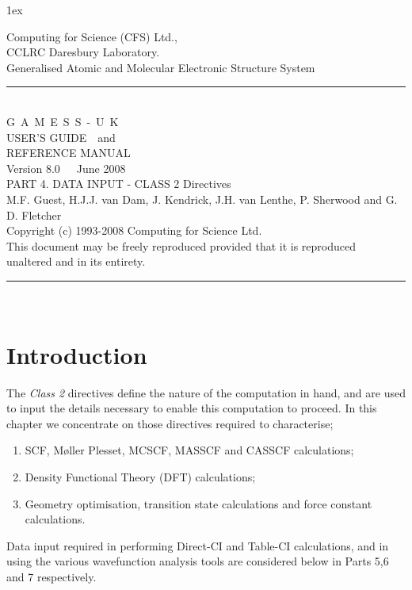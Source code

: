 \documentclass[11pt,fleqn]{article}
\begin{document}
\sf
\parindent 0cm
\parskip 1ex
\setcounter{secnumdepth}{4}
\begin{flushleft}
Computing for Science (CFS) Ltd.,\\CCLRC Daresbury Laboratory.\\[0.30in]
{\large Generalised Atomic and Molecular Electronic Structure System }\\[.2in]
\rule{150mm}{3mm}\\
\vspace{.2in}
{\huge G~A~M~E~S~S~-~U~K}\\[.3in]
{\huge USER'S GUIDE~~and}\\[.2in]
{\huge REFERENCE MANUAL}\\[0.2in]
{\huge Version 8.0~~~June 2008}\\ [.2in]
{\large PART 4. DATA INPUT - CLASS 2 Directives}\\
\vspace{.1in}
{\large M.F. Guest, H.J.J. van Dam, J. Kendrick, J.H. van Lenthe,
  P. Sherwood and G. D. Fletcher}\\[0.2in]

Copyright (c) 1993-2008 Computing for Science Ltd.\\[.1in]
This document may be freely reproduced provided that it is reproduced\\
unaltered and in its entirety.\\
\vspace{.2in}
\rule{150mm}{3mm}\\
\end{flushleft}

\tableofcontents
 
\newpage


\section[Introduction]{Introduction}

The {\em Class 2} directives define the nature of the computation
in hand, and are used to input the details necessary to enable
this computation to proceed. In this chapter we concentrate on those
directives required to characterise;
\begin{enumerate}
\item SCF,  M\o ller Plesset, MCSCF, MASSCF and CASSCF calculations;
\item Density Functional Theory (DFT) calculations;
\item Geometry optimisation, transition state calculations and
force constant calculations. 
\end{enumerate}
Data input required in performing Direct-CI and Table-CI calculations,
and in using the various wavefunction analysis tools are considered
below in Parts 5,6 and 7 respectively.
\end{document}
